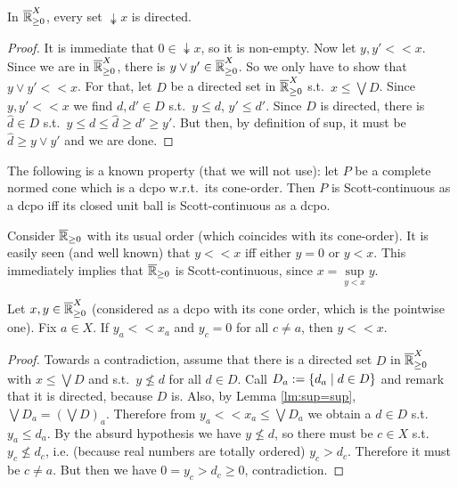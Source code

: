 \begin{lemma}\label{lm:<<dir}
 In $\overline{\mathbb{R}}_{\geq 0}^X$, every set $\twoheaddownarrow x$ is directed.
\end{lemma}
\begin{proof}
 It is immediate that $0\in\twoheaddownarrow x$, so it is non-empty.
 Now let $y,y' << x$.
 Since we are in $\overline{\mathbb{R}}_{\geq 0}^X$, there is $y\vee y'\in\overline{\mathbb{R}}_{\geq 0}^X$.
 So we only have to show that $y\vee y'<<x$.
 For that, let $D$ be a directed set in $\overline{\mathbb{R}}_{\geq 0}^X$ s.t.\ $x\leq\bigvee D$.
 Since $y,y' << x$ we find $d,d'\in D$ s.t.\ $y\leq d$, $y'\leq d'$.
 Since $D$ is directed, there is $\hat d\in D$ s.t.\ $y\leq d\leq \hat d\geq d'\geq y'$.
 But then, by definition of sup, it must be $\hat d\geq y\vee y'$ and we are done.
\end{proof}

\begin{remark}
 The following is a known property (that we will not use):
 let $P$ be a complete normed cone which is a dcpo w.r.t.\ its cone-order. Then $P$ is Scott-continuous as a dcpo iff its closed unit ball is Scott-continuous as a dcpo.
\end{remark}

\begin{remark}\label{rmk:<<R}
 Consider $\overline{\mathbb{R}}_{\geq 0}$ with its usual order (which coincides with its cone-order).
 It is easily seen (and well known) that $y<<x$ iff either $y=0$ or $y<x$.
 This immediately implies that $\overline{\mathbb{R}}_{\geq 0}$ is Scott-continuous, since $x=\sup\limits_{y<x} y$.
\end{remark}

\begin{lemma}\label{lm:<<RX}
 Let $x,y\in \overline{\mathbb{R}}_{\geq 0}^X$ (considered as a dcpo with its cone order, which is the pointwise one). Fix $a\in X$.
 If $y_a<<x_a$ and $y_c=0$ for all $c\neq a$, then $y<<x$.
\end{lemma}
\begin{proof}
 Towards a contradiction, assume that there is a directed set $D$ in $\overline{\mathbb{R}}_{\geq 0}^X$ with $x\leq\bigvee D$ and s.t.\ $y\not\leq d$ for all $d\in D$.
 Call $D_a:=\{d_a\mid d\in D\}$ and remark that it is directed, because $D$ is.
 Also, by Lemma \ref{lm:sup=sup}, $\bigvee D_a = \left(\bigvee D\right)_a$.
 Therefore from $y_a<<x_a\leq \bigvee D_a$ we obtain a $d\in D$ s.t.\ $y_a\leq d_a$.
 By the absurd hypothesis we have $y\not\leq d$, so there must be $c\in X$ s.t.\ $y_c\not\leq d_c$, i.e. (because real numbers are totally ordered) $y_c>d_c$.
 Therefore it must be $c\neq a$.
 But then we have $0=y_c>d_c\geq 0$, contradiction.
\end{proof}

